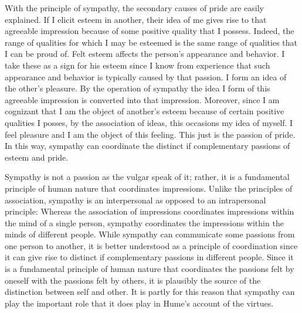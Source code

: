With the principle of sympathy, the secondary causes of pride are easily explained. If I elicit esteem in another, their idea of me gives rise to that agreeable impression because of some positive quality that I possess. Indeed, the range of qualities for which I may be esteemed is the same range of qualities that I can be proud of. Felt esteem affects the person's appearance and behavior. I take these as a sign for his esteem since I know from experience that such appearance and behavior is typically caused by that passion. I form an idea of the other's pleasure. By the operation of sympathy the idea I form of this agreeable impression is converted into that impression. Moreover, since I am cognizant that I am the object of another's esteem because of certain positive qualities I posses, by the association of ideas, this occasions my idea of myself. I feel pleasure and I am the object of this feeling. This just is the passion of pride. In this way, sympathy can coordinate the distinct if complementary passions of esteem and pride. \change

% 


Sympathy is not a passion as the vulgar speak of it; rather, it is a fundamental principle of human nature that coordinates impressions. Unlike the principles of association, sympathy is an interpersonal as opposed to an intrapersonal principle: Whereas the association of impressions coordinates impressions within the mind of a single person, sympathy coordinates the impressions within the minds of different people. While sympathy can communicate some passions from one person to another, it is better understood as a principle of coordination since it can give rise to distinct if complementary passions in different people. Since it is a fundamental principle of human nature that coordinates the passions felt by oneself with the passions felt by others, it is plausibly the source of the distinction between self and other. It is partly for this reason that sympathy can play the important role that it does play in Hume's account of the virtues. \change

